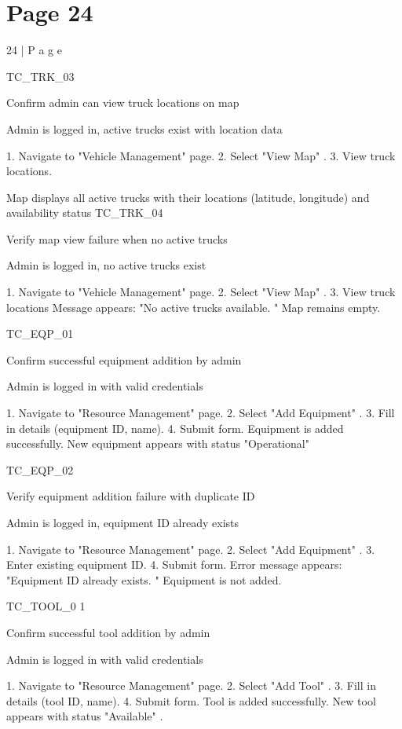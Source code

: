 \documentclass{article}
\begin{document}
\section*{Page 24}
24 | P a g e 
 
TC\_TRK\_03 
 
Confirm 
admin can 
view truck 
locations on 
map 
 
Admin is 
logged in, 
active trucks 
exist with 
location data 
 
1. Navigate to 
"Vehicle 
Management" page. 
2. Select "View Map" . 
3. View truck 
locations. 
 
Map displays all 
active trucks with 
their locations 
(latitude, longitude) 
and availability 
status 
TC\_TRK\_04 
 
Verify map 
view failure 
when no 
active 
trucks 
 
Admin is 
logged in, no 
active trucks 
exist 
 
1. Navigate to 
"Vehicle 
Management" page. 
2. Select "View Map" . 
3. View truck 
locations 
Message appears: 
"No active trucks 
available. " Map 
remains empty. 
 
TC\_EQP\_01 
 
Confirm 
successful 
equipment 
addition by 
admin 
 
Admin is 
logged in with 
valid 
credentials 
 
1. Navigate to 
"Resource 
Management" page. 
2. Select "Add 
Equipment" . 3. Fill in 
details (equipment 
ID, name). 4. Submit 
form. 
Equipment is 
added successfully. 
New equipment 
appears with status 
"Operational" 
 
TC\_EQP\_02 
 
Verify 
equipment 
addition 
failure with 
duplicate ID 
 
Admin is 
logged in, 
equipment ID 
already exists 
 
1. Navigate to 
"Resource 
Management" page. 
2. Select "Add 
Equipment" . 3. Enter 
existing equipment 
ID. 4. Submit form. 
Error message 
appears: 
"Equipment ID 
already exists. " 
Equipment is not 
added. 
 
TC\_TOOL\_0
1 
 
Confirm 
successful 
tool addition 
by admin 
 
Admin is 
logged in with 
valid 
credentials 
 
1. Navigate to 
"Resource 
Management" page. 
2. Select "Add Tool" . 
3. Fill in details (tool 
ID, name). 4. Submit 
form. 
Tool is added 
successfully. New 
tool appears with 
status "Available" . 
 
\end{document}

